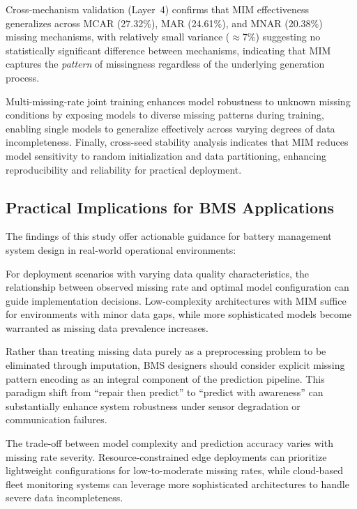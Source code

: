 \documentclass[5p,times]{elsarticle}
\begin{document}
Cross-mechanism validation (Layer~4) confirms that MIM effectiveness generalizes across MCAR (27.32\%), MAR (24.61\%), and MNAR (20.38\%) missing mechanisms, with relatively small variance ($\approx$7\%) suggesting no statistically significant difference between mechanisms, indicating that MIM captures the \emph{pattern} of missingness regardless of the underlying generation process.

Multi-missing-rate joint training enhances model robustness to unknown missing conditions by exposing models to diverse missing patterns during training, enabling single models to generalize effectively across varying degrees of data incompleteness. Finally, cross-seed stability analysis indicates that MIM reduces model sensitivity to random initialization and data partitioning, enhancing reproducibility and reliability for practical deployment.

\subsection{Practical Implications for BMS Applications}\label{sec:implications}

The findings of this study offer actionable guidance for battery management system design in real-world operational environments:

For deployment scenarios with varying data quality characteristics, the relationship between observed missing rate and optimal model configuration can guide implementation decisions. Low-complexity architectures with MIM suffice for environments with minor data gaps, while more sophisticated models become warranted as missing data prevalence increases.

Rather than treating missing data purely as a preprocessing problem to be eliminated through imputation, BMS designers should consider explicit missing pattern encoding as an integral component of the prediction pipeline. This paradigm shift from ``repair then predict'' to ``predict with awareness'' can substantially enhance system robustness under sensor degradation or communication failures.

The trade-off between model complexity and prediction accuracy varies with missing rate severity. Resource-constrained edge deployments can prioritize lightweight configurations for low-to-moderate missing rates, while cloud-based fleet monitoring systems can leverage more sophisticated architectures to handle severe data incompleteness.
\end{document}

